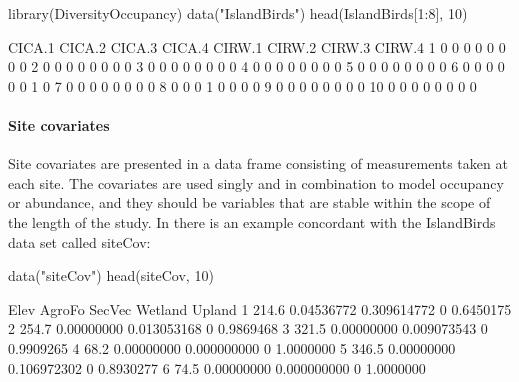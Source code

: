 \documentclass[article]{jss}
\begin{document}
\begin{CodeChunk}
\begin{CodeInput}
library(DiversityOccupancy)
data("IslandBirds")
head(IslandBirds[1:8], 10)
\end{CodeInput}
\begin{CodeOutput}
   CICA.1 CICA.2 CICA.3 CICA.4 CIRW.1 CIRW.2 CIRW.3 CIRW.4
1       0      0      0      0      0      0      0      0
2       0      0      0      0      0      0      0      0
3       0      0      0      0      0      0      0      0
4       0      0      0      0      0      0      0      0
5       0      0      0      0      0      0      0      0
6       0      0      0      0      0      0      1      0
7       0      0      0      0      0      0      0      0
8       0      0      0      1      0      0      0      0
9       0      0      0      0      0      0      0      0
10      0      0      0      0      0      0      0      0
\end{CodeOutput}
\end{CodeChunk}

\paragraph{Site covariates}\label{site-covariates}

Site covariates are presented in a data frame consisting of measurements
taken at each site. The covariates are used singly and in combination to
model occupancy or abundance, and they should be variables that are
stable within the scope of the length of the study. In
 there is an example concordant with the
IslandBirds data set called siteCov:

\begin{CodeChunk}
\begin{CodeInput}
data("siteCov")
head(siteCov, 10)
\end{CodeInput}
\end{CodeChunk}

\begin{CodeChunk}
\begin{CodeOutput}
   Elev     AgroFo      SecVec Wetland    Upland
1 214.6 0.04536772 0.309614772       0 0.6450175
2 254.7 0.00000000 0.013053168       0 0.9869468
3 321.5 0.00000000 0.009073543       0 0.9909265
4  68.2 0.00000000 0.000000000       0 1.0000000
5 346.5 0.00000000 0.106972302       0 0.8930277
6  74.5 0.00000000 0.000000000       0 1.0000000
\end{CodeOutput}
\end{CodeChunk}
\end{document}
